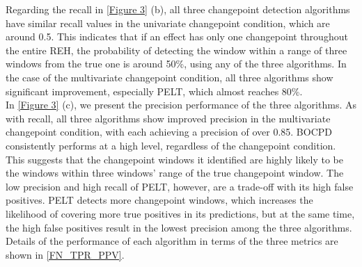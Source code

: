 \documentclass[]{interact}
\theoremstyle{plain}%
\theoremstyle{definition}
\theoremstyle{remark}
\begin{document}
{	Regarding the recall in \autoref{Figure 3} (b), all three changepoint detection algorithms have similar recall values in the univariate changepoint condition, which are around 0.5. This indicates that if an effect has only one changepoint throughout the entire REH, the probability of detecting the window within a range of three windows from the true one is around 50\%, using any of the three algorithms. In the case of the multivariate changepoint condition, all three algorithms show significant improvement, especially PELT, which almost reaches 80\%. \\
	
	In \autoref{Figure 3} (c), we present the precision performance of the three algorithms. As with recall, all three algorithms show improved precision in the multivariate changepoint condition, with each achieving a precision of over 0.85. BOCPD consistently performs at a high level, regardless of the changepoint condition. This suggests that the changepoint windows it identified are highly likely to be the windows within three windows' range of the true changepoint window. The low precision and high recall of PELT, however, are a trade-off with its high false positives. PELT detects more changepoint windows, which increases the likelihood of covering more true positives in its predictions, but at the same time, the high false positives result in the lowest precision among the three algorithms. Details of the performance of each algorithm in terms of the three metrics are shown in \autoref{FN_TPR_PPV}.
	
}
\end{document}
